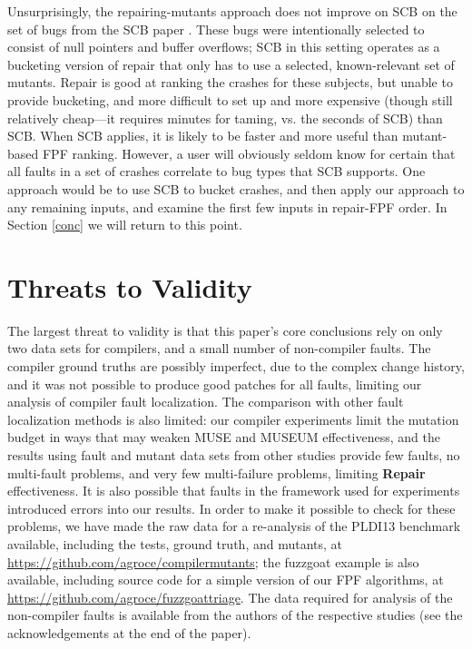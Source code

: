 Unsurprisingly, the repairing-mutants approach does not improve on SCB on the set of bugs from the SCB paper \cite{SCB}.  These bugs were intentionally selected to consist of null pointers and buffer overflows; SCB in this setting operates as a bucketing version of repair that only has to use a selected, known-relevant set of mutants.  Repair is good at ranking the crashes for these subjects, but unable to provide bucketing, and more difficult to set up and more expensive (though still relatively cheap---it requires minutes for taming, vs. the seconds of SCB) than SCB.  When SCB applies, it is likely to be faster and more useful than mutant-based FPF ranking.  However, a user will obviously seldom know for certain that all faults in a set of crashes correlate to bug types that SCB supports. One approach would be to use SCB to bucket crashes, and then apply our approach to any remaining inputs, and examine the first few inputs in repair-FPF order.  In Section \ref{conc} we will return to this point.

\section{Threats to Validity}

The largest threat to validity is that this paper's core conclusions rely on only two data sets for compilers, and a small number of non-compiler faults.  The compiler ground truths are possibly imperfect, due to the complex change history, and it was not possible to produce good patches for all faults, limiting our analysis of compiler fault localization.    The comparison with other fault localization methods is also limited:  our compiler experiments limit the mutation budget in ways that may weaken MUSE and MUSEUM effectiveness, and the results using fault and mutant data sets from other studies provide few faults, no multi-fault problems, and very few multi-failure problems, limiting {\bf Repair} effectiveness.   It is also possible that faults in the framework used for experiments introduced errors into our results.  In order to make it possible to check for these problems, we have made the raw data for a re-analysis of the PLDI13 benchmark available, including the tests, ground truth, and mutants, at \url{https://github.com/agroce/compilermutants}; the fuzzgoat example is also available, including source code for a simple version of our FPF algorithms, at \url{https://github.com/agroce/fuzzgoattriage}.  The data required for analysis of the non-compiler faults is available from the authors of the respective studies (see the acknowledgements at the end of the paper).

